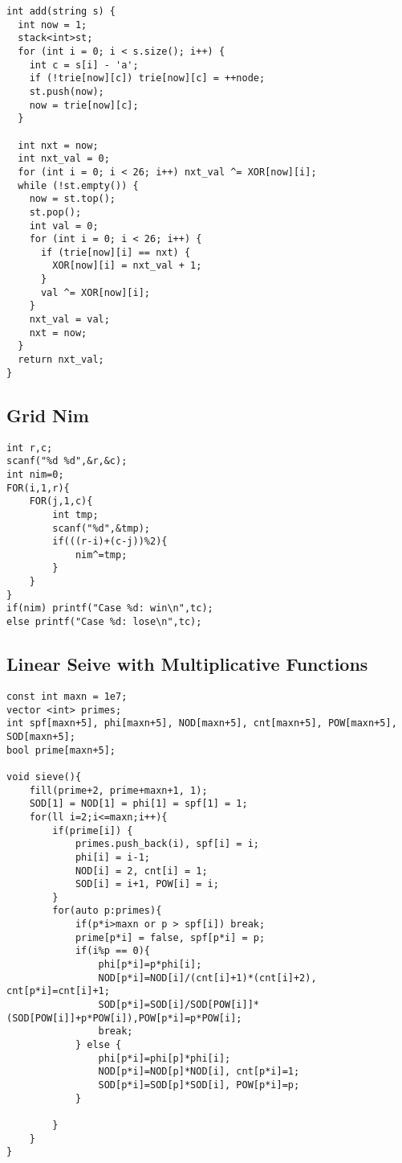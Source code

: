 \documentclass[10pt,a4paper,onesided]{article}
\begin{document}
\begin{multicols*}{3}
\begin{lstlisting}
int add(string s) {
  int now = 1;
  stack<int>st;
  for (int i = 0; i < s.size(); i++) {
    int c = s[i] - 'a';
    if (!trie[now][c]) trie[now][c] = ++node;
    st.push(now);
    now = trie[now][c];
  }

  int nxt = now;
  int nxt_val = 0;
  for (int i = 0; i < 26; i++) nxt_val ^= XOR[now][i];
  while (!st.empty()) {
    now = st.top();
    st.pop();
    int val = 0;
    for (int i = 0; i < 26; i++) {
      if (trie[now][i] == nxt) {
        XOR[now][i] = nxt_val + 1;
      }
      val ^= XOR[now][i];
    }
    nxt_val = val;
    nxt = now;
  }
  return nxt_val;
}
\end{lstlisting}
\subsection{Grid Nim}
\begin{lstlisting}
int r,c;
scanf("%d %d",&r,&c);
int nim=0;
FOR(i,1,r){
    FOR(j,1,c){
        int tmp;
        scanf("%d",&tmp);
        if(((r-i)+(c-j))%2){
            nim^=tmp;
        }
    }
}
if(nim) printf("Case %d: win\n",tc);
else printf("Case %d: lose\n",tc);
\end{lstlisting}
\subsection{Linear Seive with Multiplicative Functions}
\begin{lstlisting}
const int maxn = 1e7;
vector <int> primes;
int spf[maxn+5], phi[maxn+5], NOD[maxn+5], cnt[maxn+5], POW[maxn+5], SOD[maxn+5]; 
bool prime[maxn+5];

void sieve(){
    fill(prime+2, prime+maxn+1, 1);
    SOD[1] = NOD[1] = phi[1] = spf[1] = 1;
    for(ll i=2;i<=maxn;i++){
        if(prime[i]) {
            primes.push_back(i), spf[i] = i;
            phi[i] = i-1;
            NOD[i] = 2, cnt[i] = 1;
            SOD[i] = i+1, POW[i] = i;
        }
        for(auto p:primes){
            if(p*i>maxn or p > spf[i]) break;
            prime[p*i] = false, spf[p*i] = p;
            if(i%p == 0){
                phi[p*i]=p*phi[i];
                NOD[p*i]=NOD[i]/(cnt[i]+1)*(cnt[i]+2), cnt[p*i]=cnt[i]+1;
                SOD[p*i]=SOD[i]/SOD[POW[i]]*(SOD[POW[i]]+p*POW[i]),POW[p*i]=p*POW[i];
                break;
            } else {
                phi[p*i]=phi[p]*phi[i];
                NOD[p*i]=NOD[p]*NOD[i], cnt[p*i]=1;
                SOD[p*i]=SOD[p]*SOD[i], POW[p*i]=p;
            }

        }
    }
}\end{lstlisting}

\end{multicols*}
\end{document}
